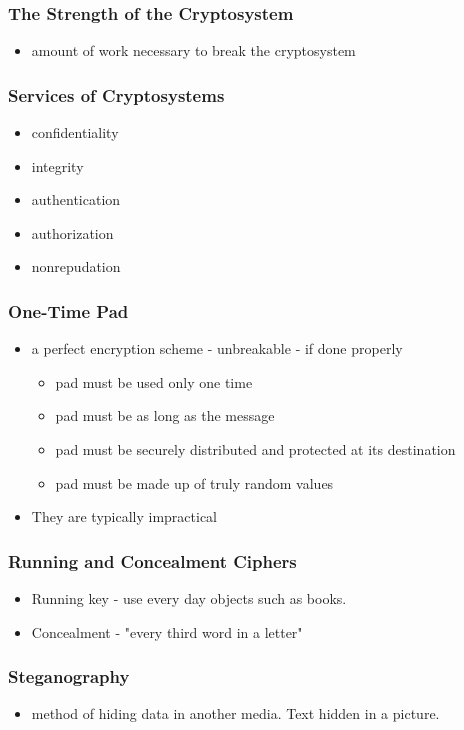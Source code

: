 \documentclass[11pt]{article}
\begin{document}
\subsubsection{The Strength of the Cryptosystem}
\label{sec:orgc4f2895}
\begin{itemize}
\item amount of work necessary to break the cryptosystem
\end{itemize}
\subsubsection{Services of Cryptosystems}
\label{sec:orgf32dbf7}
\begin{itemize}
\item confidentiality
\item integrity
\item authentication
\item authorization
\item nonrepudation
\end{itemize}
\subsubsection{One-Time Pad}
\label{sec:org182de15}
\begin{itemize}
\item a perfect encryption scheme - unbreakable - if done properly
\begin{itemize}
\item pad must be used only one time
\item pad must be as long as the message
\item pad must be securely distributed and protected at its destination
\item pad must be made up of truly random values
\end{itemize}
\item They are typically impractical
\end{itemize}
\subsubsection{Running and Concealment Ciphers}
\label{sec:org8693c19}
\begin{itemize}
\item Running key - use every day objects such as books.
\item Concealment - "every third word in a letter"
\end{itemize}
\subsubsection{Steganography}
\label{sec:org9bf32c8}
\begin{itemize}
\item method of hiding data in another media. Text hidden in a picture.
\end{itemize}
\end{document}
